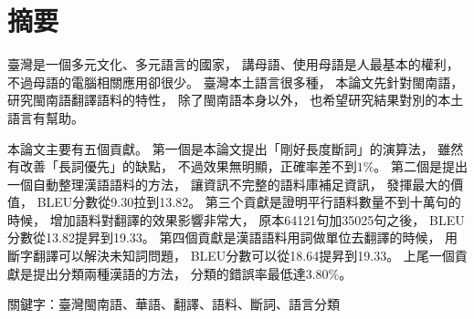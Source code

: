 \chapter{摘要}
臺灣是一個多元文化、多元語言的國家，
講母語、使用母語是人最基本的權利，
不過母語的電腦相關應用卻很少。
臺灣本土語言很多種，
本論文先針對閩南語，
研究閩南語翻譯語料的特性，
除了閩南語本身以外，
也希望研究結果對別的本土語言有幫助。

本論文主要有五個貢獻。
第一個是本論文提出「剛好長度斷詞」的演算法，
雖然有改善「長詞優先」的缺點，
不過效果無明顯，正確率差不到$1\%$。
第二個是提出一個自動整理漢語語料的方法，
讓資訊不完整的語料庫補足資訊，
發揮最大的價值，
BLEU分數從9.30拉到13.82。
第三个貢獻是證明平行語料數量不到十萬句的時候，
增加語料對翻譯的效果影響非常大，
原本64121句加35025句之後，
BLEU分數從13.82提昇到19.33。
第四個貢獻是漢語語料用詞做單位去翻譯的時候，
用斷字翻譯可以解決未知詞問題，
BLEU分數可以從18.64提昇到19.33。
上尾一個貢獻是提出分類兩種漢語的方法，
分類的錯誤率最低達$3.80\%$。

關鍵字：臺灣閩南語、華語、翻譯、語料、斷詞、語言分類
